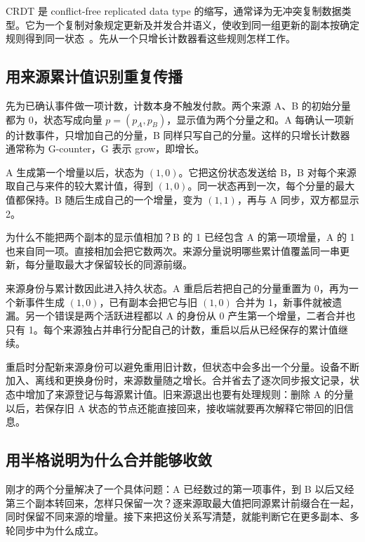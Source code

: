 CRDT 是 conflict-free replicated data type 的缩写，通常译为无冲突复制数据类型。它为一个复制对象规定更新及并发合并语义，使收到同一组更新的副本按确定规则得到同一状态~\cite{preguica2018crdt}。先从一个只增长计数器看这些规则怎样工作。

\subsection*{用来源累计值识别重复传播}

先为已确认事件做一项计数，计数本身不触发付款。两个来源 A、B 的初始分量都为 0，状态写成向量 $p=(p_A,p_B)$，显示值为两个分量之和。A 每确认一项新的计数事件，只增加自己的分量，B 同样只写自己的分量。这样的只增长计数器通常称为 G-counter，G 表示 grow，即增长。

A 生成第一个增量以后，状态为 $(1,0)$。它把这份状态发送给 B，B 对每个来源取自己与来件的较大累计值，得到 $(1,0)$。同一状态再到一次，每个分量的最大值都保持。B 随后生成自己的一个增量，变为 $(1,1)$，再与 A 同步，双方都显示 2。

为什么不能把两个副本的显示值相加？B 的 1 已经包含 A 的第一项增量，A 的 1 也来自同一项。直接相加会把它数两次。来源分量说明哪些累计值覆盖同一串更新，每分量取最大才保留较长的同源前缀。


来源身份与累计数因此进入持久状态。A 重启后若把自己的分量重置为 0，再为一个新事件生成 $(1,0)$，已有副本会把它与旧 $(1,0)$ 合并为 1，新事件就被遗漏。另一个错误是两个活跃进程都以 A 的身份从 0 产生第一个增量，二者合并也只有 1。每个来源独占并串行分配自己的计数，重启以后从已经保存的累计值继续。

重启时分配新来源身份可以避免重用旧计数，但状态中会多出一个分量。设备不断加入、离线和更换身份时，来源数量随之增长。合并省去了逐次同步报文记录，状态中增加了来源登记与每源累计值。旧来源退出也要有处理规则：删除 A 的分量以后，若保存旧 A 状态的节点还能直接回来，接收端就要再次解释它带回的旧信息。

\subsection*{用半格说明为什么合并能够收敛}

刚才的两个分量解决了一个具体问题：A 已经数过的第一项事件，到 B 以后又经第三个副本转回来，怎样只保留一次？逐来源取最大值把同源累计前缀合在一起，同时保留不同来源的增量。接下来把这份关系写清楚，就能判断它在更多副本、多轮同步中为什么成立。

